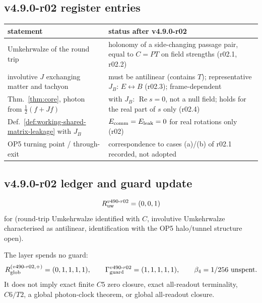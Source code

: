 \subsection*{v4.9.0-r02 register entries}
\label{subsec:v490-r02-register}

\begin{center}
\small
\begin{tabular}{@{}>{\raggedright\arraybackslash}p{}>{\raggedright\arraybackslash}p{}@{}}
\toprule
statement & status after v4.9.0-r02\\
\midrule
Umkehrwalze of the round trip & holonomy of a side-changing passage pair, equal to \(C=PT\) on field strengths (r02.1, r02.2)\\
involutive \(J\) exchanging matter and tachyon & must be antilinear (contains \(T\)); representative \(J_B\): \(E\leftrightarrow B\) (r02.3); frame-dependent\\
Thm.~\ref{thm:core}, photon from \(\tfrac12(f+Jf)\) & with \(J_B\): \(\operatorname{Re}s=0\), not a null field; holds for the real part of \(s\) only (r02.4)\\
Def.~\ref{def:working-shared-matrix-leakage} with \(J_B\) & \(E_{\rm comm}=E_{\rm leak}=0\) for real rotations only (r02)\\
OP5 turning point / through-exit & correspondence to cases (a)/(b) of r02.1 recorded, not adopted\\
\bottomrule
\end{tabular}
\end{center}

\subsection*{v4.9.0-r02 ledger and guard update}
\label{subsec:v490-r02-ledger-guard}

\[
R_{\rm uw}^{v490\text{-}r02}=(0,0,1)
\]
for (round-trip Umkehrwalze identified with \(C\), involutive Umkehrwalze characterised as antilinear,
identification with the OP5 halo/tunnel structure open).

The layer spends no guard:
\[
R_{\rm glob}^{(v490\text{-}r02,+)}=(0,1,1,1,1),
\qquad
\Gamma_{\rm guard}^{v490\text{-}r02}=(1,1,1,1,1),
\qquad
\beta_4=1/256\ \text{unspent}.
\]
It does not imply exact finite \(C5\) zero closure, exact all-readout terminality,
\(C6/T2\), a global photon-clock theorem, or global all-readout closure.

\clearpage
